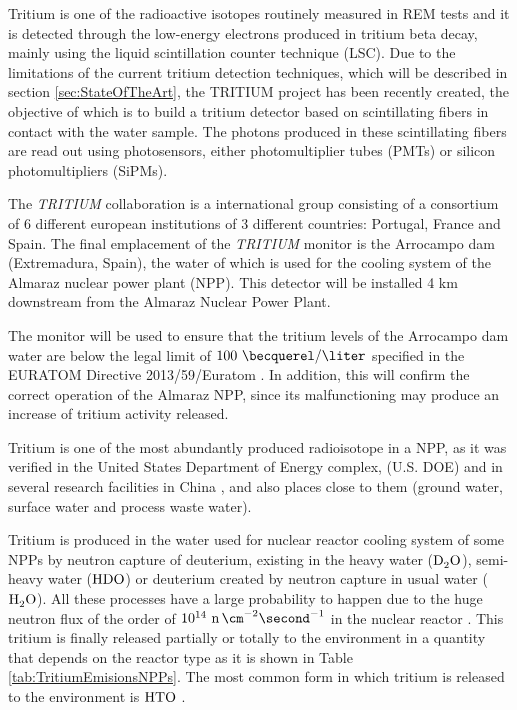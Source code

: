 Tritium is one of the radioactive isotopes routinely measured in REM tests and it is detected through the low-energy electrons produced in tritium beta decay, mainly using the liquid scintillation counter technique (LSC). Due to the limitations of the current tritium detection techniques, which will be described in section \ref{sec:StateOfTheArt}, the TRITIUM project has been recently created, the objective of which is to build a tritium detector based on scintillating fibers in contact with the water sample. The photons produced in these scintillating fibers are read out using photosensors, either photomultiplier tubes (PMTs) or silicon photomultipliers (SiPMs). 

The \textit{TRITIUM} collaboration is a international group consisting of a consortium of 6 different european institutions of 3 different countries: Portugal, France and Spain. The final emplacement of the \textit{TRITIUM} monitor is the Arrocampo dam (Extremadura, Spain), the water of which is used for the cooling system of the Almaraz nuclear power plant (NPP). This detector will be installed 4 km downstream from the Almaraz Nuclear Power Plant.

The monitor will be used to ensure that the tritium levels of the Arrocampo dam  water are below the legal limit of $100~\becquerel/\liter$ specified in the EURATOM Directive 2013/59/Euratom \cite{100BqL}. In addition, this will confirm the correct operation of the Almaraz NPP, since its malfunctioning may produce an increase of tritium activity released.

Tritium is one of the most abundantly produced radioisotope in a NPP, as it was verified in the United States Department of Energy complex, (U.S. DOE) \cite{FiberDetector1a, FiberDetector1b} and in several research facilities in China \cite{CommonEmissionTritium}, and also places close to them (ground water, surface water and process waste water).

Tritium is produced in the water used for nuclear reactor cooling system of some NPPs by neutron capture of deuterium, existing in the heavy water ($\ce{D_2 O}$), semi-heavy water ($\ce{H D O}$) or deuterium created by neutron capture in usual water ($\ce{H_2 O}$). All these processes have a large probability to happen due to the huge neutron flux of the order of $10^{14} ~\ce{n} \, \cm^{-2} \second^{-1}$ in the nuclear reactor \cite{CrossSeccionNeutrons}. This tritium is finally released partially or totally to the environment in a quantity that depends on the reactor type as it is shown in Table \ref{tab:TritiumEmisionsNPPs}. The most common form in which tritium is released to the environment is $\ce{HTO}$ \cite{CommonEmissionTritium}.

